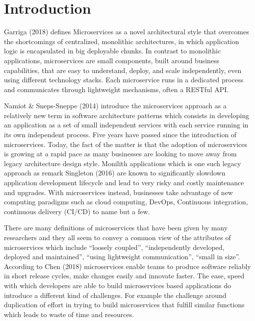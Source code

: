 \documentclass{article}
\begin{document}
\section{Introduction}


Garriga (2018) defines Microservices as a novel architectural style that overcomes the shortcomings of centralized, monolithic architectures, in which application logic is encapsulated in big deployable chunks. In contrast to monolithic applications, microservices are small components, built around business capabilities, that are easy to understand, deploy, and scale independently, even using different technology stacks. Each microservice runs in a dedicated process and communicates through lightweight mechanisms, often a RESTful API.


Namiot \& Sneps-Sneppe (2014) introduce the microservices approach as a relatively new term in software architecture patterns which consists in developing an application as a set of small independent services with each service running in its own independent process. Five years have passed since the introduction of microservices. Today, the fact of the matter is that the adoption of microservices is growing at a rapid pace as many businesses are looking to move away from legacy architecture design style. Monilith applications which is one such legacy approach as remark Singleton (2016) are known to significantly slowdown application development lifecycle and lead to very risky and costly maintenance and upgrades. With microservices instead, businesses take advantage of new computing paradigms such as cloud computing, DevOps, Continuous integration, continuous delivery (CI/CD) to name but a few.


There are many definitions of microservices that have been given by many researchers and they all seem to convey a common view of the attributes of microservices which include “loosely coupled”, “independently developed, deployed and maintained”, “using lightweight communication”, “small in size”. According to Chen (2018) microservices enable teams to produce software reliably in short release cycles, make changes easily and innovate faster. The ease, speed with which developers are able to build microservices based applications do introduce a different kind of challenges. For example the challenge around duplication of effort in trying to build microservices that fulfill similar functions which leads to waste of time and resources.
\end{document}
